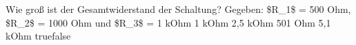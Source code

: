     {Wie groß ist der Gesamtwiderstand der Schaltung? Gegeben: \$R\_1\$ = 500 Ohm, \$R\_2\$ = 1000 Ohm und \$R\_3\$ = 1 kOhm}
    {1 kOhm}
    {2,5 kOhm}
    {501 Ohm}
    {5,1 kOhm}
    {true}{false}